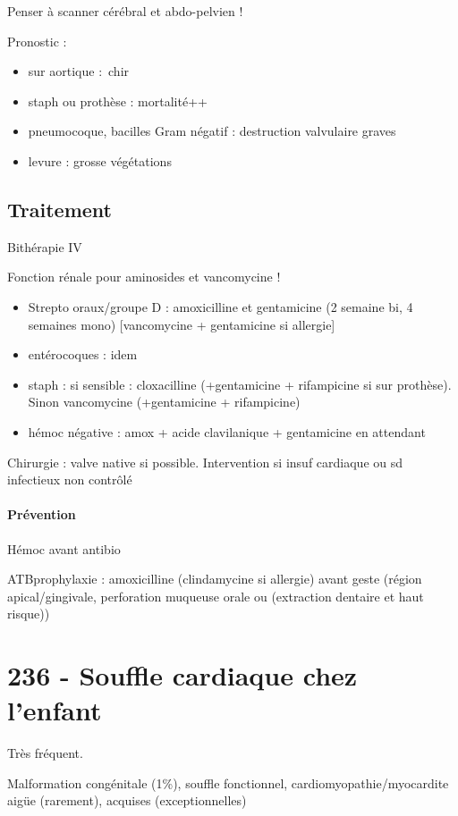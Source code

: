 Penser à scanner cérébral et abdo-pelvien !

Pronostic : 
\begin{itemize}
  \item sur aortique : chir
  \item staph ou prothèse : mortalité++
  \item pneumocoque, bacilles Gram négatif : destruction valvulaire graves
  \item levure : grosse végétations
\end{itemize}

\subsection{Traitement}
Bithérapie IV

Fonction rénale pour aminosides et vancomycine !

\begin{itemize}
  \item Strepto oraux/groupe D : amoxicilline et gentamicine (2 semaine bi, 4
    semaines mono) [vancomycine + gentamicine si allergie]
  \item entérocoques : idem
  \item staph : si sensible : cloxacilline (+gentamicine + rifampicine si sur
    prothèse). Sinon vancomycine (+gentamicine + rifampicine)
  \item hémoc négative :  amox + acide clavilanique + gentamicine en attendant
\end{itemize}

Chirurgie : valve native si possible. Intervention si insuf cardiaque ou sd
infectieux non contrôlé

\paragraph{Prévention}
Hémoc avant antibio \danger

ATBprophylaxie : amoxicilline (clindamycine si allergie) avant geste (région
apical/gingivale, perforation muqueuse orale ou (extraction dentaire et haut
risque))

\section{236 - Souffle cardiaque chez l'enfant}%
\label{sec:236_souffle_cardiaque_chez_l_enfant}
Très fréquent.

Malformation congénitale (1\%), souffle fonctionnel, cardiomyopathie/myocardite
aigüe (rarement), acquises (exceptionnelles)

